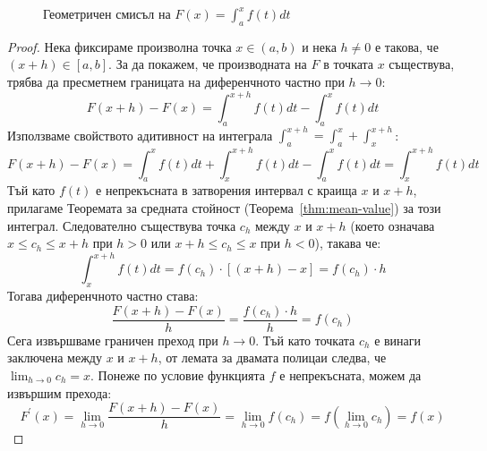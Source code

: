 \documentclass{scrartcl}
\begin{document}
\begin{FlushLeft}
\begin{figure}[H]
\centering
{}
\caption{Геометричен смисъл на $F(x) = \int_a^x f(t)dt$}
\end{figure}

\begin{proof}
Нека фиксираме произволна точка $x \in (a, b)$ и нека $h \neq 0$ е такова, че $(x + h) \in [a, b]$. За да покажем, че производната на $F$ в точката $x$ съществува, трябва да пресметнем границата на диференчното частно при $h \to 0$:
\[ F(x+h) - F(x) = \int_a^{x+h} f(t)dt - \int_a^x f(t)dt \]
Използваме свойството адитивност на интеграла $\int_a^{x+h} = \int_a^x + \int_x^{x+h}$:
\[ F(x+h) - F(x) = \int_a^x f(t)dt + \int_x^{x+h} f(t)dt - \int_a^x f(t)dt = \int_x^{x+h} f(t)dt \]
Тъй като $f(t)$ е непрекъсната в затворения интервал с краища $x$ и $x+h$, прилагаме Теоремата за средната стойност (Теорема~\ref{thm:mean-value}) за този интеграл. Следователно съществува точка $c_h$ между $x$ и $x+h$ (което означава $x \le c_h \le x+h$ при $h>0$ или $x+h \le c_h \le x$ при $h<0$), такава че:
\[ \int_x^{x+h} f(t)dt = f(c_h) \cdot [(x+h) - x] = f(c_h) \cdot h \]
Тогава диференчното частно става:
\[ \frac{F(x+h) - F(x)}{h} = \frac{f(c_h) \cdot h}{h} = f(c_h) \]
Сега извършваме граничен преход при $h \to 0$. Тъй като точката $c_h$ е винаги заключена между $x$ и $x+h$, от лемата за двамата полицаи следва, че $\lim_{h \to 0} c_h = x$. Понеже по условие функцията $f$ е непрекъсната, можем да извършим прехода:
\[ F^{\prime}(x) = \lim_{h \to 0} \frac{F(x+h) - F(x)}{h} = \lim_{h \to 0} f(c_h) = f\left(\lim_{h \to 0} c_h\right) = f(x) \]
\end{proof}


\end{FlushLeft}
\end{document}
